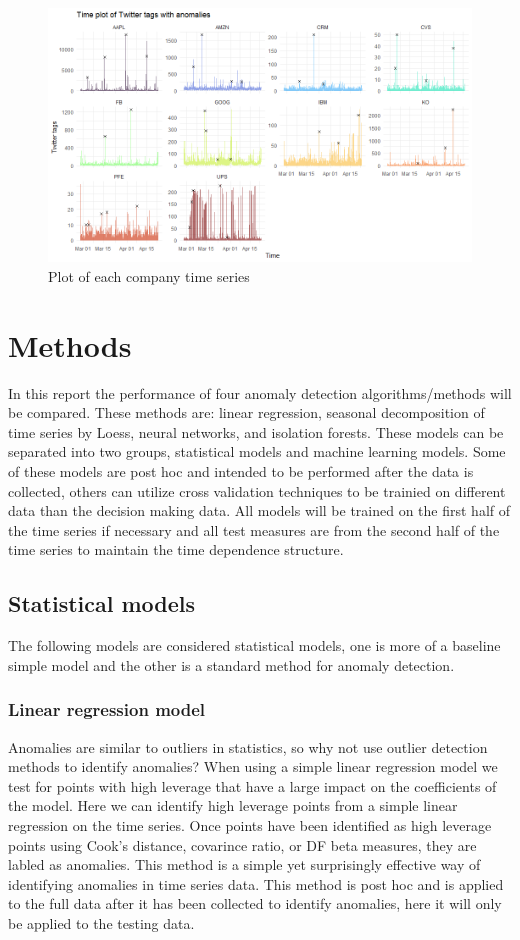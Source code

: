 \documentclass{article}
\begin{document}
\begin{figure}[!ht]
    \centering
    \includegraphics[width=.7\textwidth]{data_plot.png}
    \caption{Plot of each company time series}
    \label{fig:data}
\end{figure}

\newpage 

\section{Methods}
In this report the performance of four anomaly detection algorithms/methods will be compared. These methods are: linear regression, seasonal decomposition of time series by Loess, neural networks, and isolation forests. These models can be separated into two groups, statistical models and machine learning models. Some of these models are post hoc and intended to be performed after the data is collected, others can utilize cross validation techniques to be trainied on different data than the decision making data. All models will be trained on the first half of the time series if necessary and all test measures are from the second half of the time series to maintain the time dependence structure.

\subsection{Statistical models}
The following models are considered statistical models, one is more of a baseline simple model and the other is a standard method for anomaly detection. 

\subsubsection{Linear regression model}
Anomalies are similar to outliers in statistics, so why not use outlier detection methods to identify anomalies? When using a simple linear regression model we test for points with high leverage that have a large impact on the coefficients of the model. Here we can identify high leverage points from a simple linear regression on the time series. Once points have been identified as high leverage points using Cook's distance, covarince ratio, or DF beta measures, they are labled as anomalies. This method is a simple yet surprisingly effective way of identifying anomalies in time series data. This method is post hoc and is applied to the full data after it has been collected to identify anomalies, here it will only be applied to the testing data. 
\end{document}
